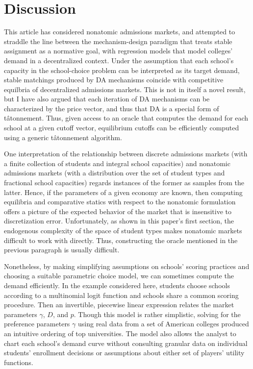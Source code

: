 \documentclass[12pt]{article}
\theoremstyle{definition}
\begin{document}
\section{Discussion}
This article has considered nonatomic admissions markets, and attempted to straddle the line between the mechanism-design paradigm that treats stable assignment as a normative goal, with regression models that model colleges' demand in a decentralized context. Under the assumption that each school's capacity in the school-choice problem can be interpreted as its target demand, stable matchings produced by DA mechanisms coincide with competitive equilbria of decentralized admissions markets. This is not in itself a novel result, but I have also argued that each iteration of DA mechanisms can be characterized by the price vector, and thus that DA is a special form of t\^{a}tonnement. Thus, given access to an oracle that computes the demand for each school at a given cutoff vector, equilibrium cutoffs can be efficiently computed using a generic t\^{a}tonnement algorithm.

One interpretation of the relationship between discrete admissions markets (with a finite collection of students and integral school capacities) and nonatomic admissions markets (with a distribution over the set of student types and fractional school capacities) regards instances of the former as samples from the latter. Hence, if the parameters of a given economy are known, then computing equilibria and comparative statics with respect to the nonatomic formulation offers a picture of the expected behavior of the market that is insensitive to discretization error. Unfortunately, as shown in this paper's first section, the endogenous complexity of the space of student types makes nonatomic markets difficult to work with directly. Thus, constructing the oracle mentioned in the previous paragraph is usually difficult. 

Nonetheless, by making simplifying assumptions on schools' scoring practices and choosing a suitable parametric choice model, we can sometimes compute the demand efficiently. In the example considered here, students choose schools according to a multinomial logit function and schools share a common scoring procedure. Then an invertible, piecewise linear expression relates the market parameters $\gamma$, $D$, and $p$. Though this model is rather simplistic, solving for the preference parameters $\gamma$ using real data from a set of American colleges produced an intuitive ordering of top universities. The model also allows the analyst to chart each school's demand curve without consulting granular data on individual students' enrollment decisions or assumptions about either set of players' utility functions. 
\end{document}
